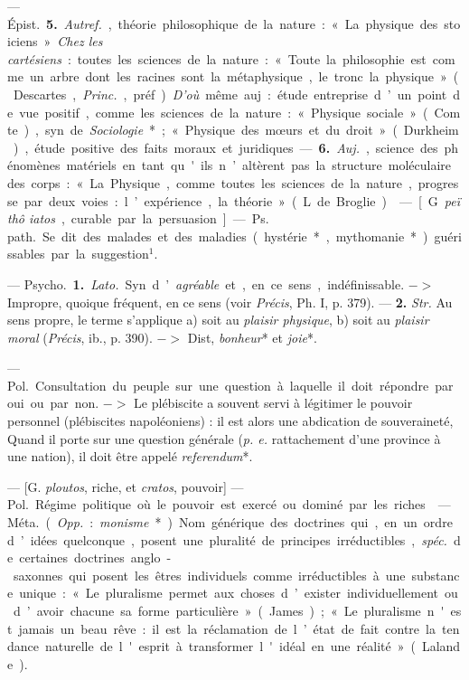 \begin{itemize}[leftmargin=1cm, label=, itemsep=1pt]
 — \si{Épist.} {\bf 5.} {\it Autref.}, théorie
philosophique de la nature : « La physique des stoiciens ». {\it Chez les
cartésiens} : toutes les sciences de la nature : « Toute la philosophie est
comme un arbre dont les racines sont la métaphysique, le tronc la physique
» (Descartes, {\it Princ.}, préf.). {\it D'où} même auj. : étude entreprise
d’un point de vue positif, comme les sciences de la nature : « Physique
sociale » (Comte), syn. de {\it Sociologie}* ; « Physique des mœurs et du
droit » (Durkheim), étude positive des faits moraux et juridiques. — {\bf 6.}
{\it Auj.}, science des phénomènes matériels en tant qu'ils n’altèrent pas la
structure moléculaire des corps : « La Physique, comme toutes les sciences de
la nature, progresse par deux voies : l’expérience, la théorie » (L. de
Broglie).

 — [G. {\it peïthô iatos}, curable par la persuasion] —
\si{Ps. path.} Se dit des malades et des maladies (hystérie*, mythomanie*)
guérissables par la suggestion$^1$.

 — \si{Psycho.} {\bf 1.} {\it Lato.} Syn. d’{\it agréable} et, en
ce sens, indéfinissable. $->$ Impropre, quoique fréquent, en ce sens (voir
{\it Précis}, Ph. I, p. 379). — {\bf 2.} {\it Str.} Au sens propre, le terme
s'applique {\it }a) soit au {\it plaisir physique}, {\it }b) soit au {\it
plaisir moral} ({\it Précis}, ib., p. 390). $->$ Dist, {\it bonheur}* et {\it
joie}*.

 — \si{Pol.} Consultation du peuple sur une question à
laquelle il doit répondre par oui ou par non. $->$ Le plébiscite a souvent
servi à légitimer le pouvoir personnel (plébiscites napoléoniens) : il est
alors une abdication de souveraineté, Quand il porte sur une question
générale ({\it p. e.} rattachement d'une province à une nation), il doit être
appelé {\it referendum}*.

 — [G. {\it ploutos}, riche, et {\it cratos}, pouvoir] —
\si{Pol.} Régime politique où le pouvoir est exercé ou dominé par les riches.

 — \si{Méta.} ({\it Opp.} : {\it monisme}*). Nom générique des
doctrines qui, en un ordre d’idées quelconque, posent une pluralité de
principes irréductibles, {\it spéc.} de certaines doctrines anglo-saxonnes
qui posent les êtres individuels comme irréductibles à une substance unique :
« Le pluralisme permet aux choses d’exister individuellement ou d’avoir
chacune sa forme particulière » (James) ; « Le pluralisme n'est jamais un
beau rêve : il est la réclamation de l’état de fait contre la tendance
naturelle de l'esprit à transformer l'idéal en une réalité » (Lalande).


\end{itemize}
